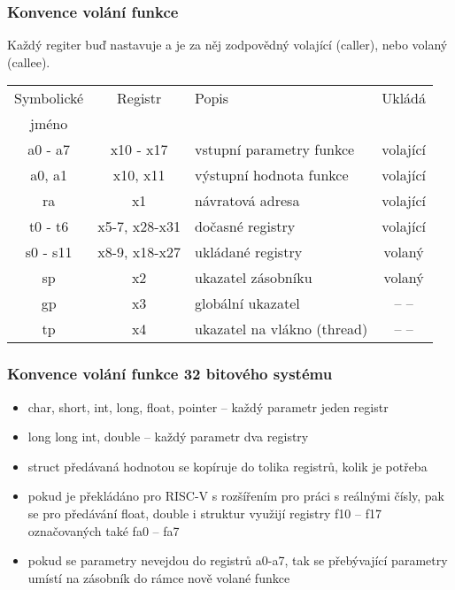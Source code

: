\documentclass{beamer}
\begin{document}
\begin{frame}
\frametitle{Konvence volání funkce}

Každý regiter buď nastavuje a je za něj zodpovědný volající (caller), nebo volaný (callee). 

\begin{tabular}{|c|c|p{4cm}|c|}\hline
Symbolické & Registr & Popis & Ukládá \\
   jméno   &         &       &        \\ \hline
a0 - a7 & x10 - x17 & vstupní parametry funkce & volající \\\hline
a0, a1 & x10, x11 & výstupní hodnota funkce & volající \\\hline
ra & x1 & návratová adresa & volající \\\hline
t0 - t6 & x5-7, x28-x31 & dočasné registry & volající\\\hline
s0 - s11 & x8-9, x18-x27 & ukládané registry & volaný\\\hline
sp & x2 & ukazatel zásobníku & volaný\\\hline
gp & x3 & globální ukazatel & -- --\\\hline
tp & x4 & ukazatel na vlákno (thread) & -- --\\\hline
\end{tabular}
\end{frame}


\begin{frame}
\frametitle{Konvence volání funkce 32 bitového systému}

\begin{itemize}
 \item char, short, int, long, float, pointer -- každý parametr jeden registr
 \item long long int, double -- každý parametr dva registry
 \item struct předávaná hodnotou se kopíruje do tolika registrů, kolik je potřeba
 \item pokud je překládáno pro RISC-V s rozšířením pro práci s reálnými čísly, pak se pro předávání float, double i struktur využijí registry f10 -- f17 označovaných také fa0 -- fa7
 \item pokud se parametry nevejdou do registrů a0-a7, tak se přebývající parametry umístí na zásobník do rámce nově volané funkce
\end{itemize}
\end{frame}
\end{document}
